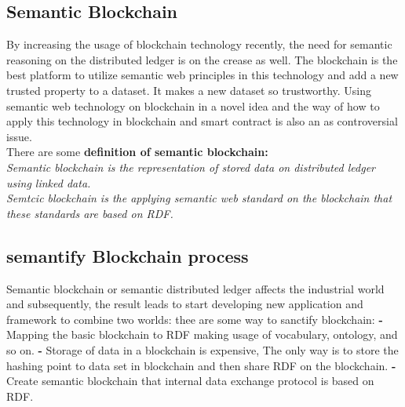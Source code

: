 \subsection{Semantic Blockchain}
By increasing the usage of blockchain technology recently, the need for semantic reasoning on the distributed ledger is on the crease as well. The blockchain is the best platform to utilize semantic web principles in this technology and add a new trusted property to a dataset. It makes a new dataset so trustworthy. 
Using semantic web technology on blockchain in a novel idea and the way of how to apply this technology in blockchain and smart contract is also an as controversial issue.\\
There are some \textbf{definition of semantic blockchain:}\\ 
\textit{Semantic blockchain is the representation of stored data on distributed ledger using linked data. }\\
\textit{Semtcic blockchain is the applying semantic web standard on the blockchain that these standards are based on RDF.}

\subsection{semantify Blockchain process}
Semantic blockchain or semantic distributed ledger affects the industrial world and subsequently, the result leads to start developing new application and framework to combine two worlds:
thee are some way to sanctify blockchain:
\textbf{-}Mapping the basic blockchain to RDF making usage of vocabulary, ontology, and so on.
\textbf{-} Storage of data in a blockchain is expensive, The only way is to store the hashing point to data set in blockchain and then share RDF on the blockchain.
\textbf{-} Create semantic blockchain that internal data exchange protocol is based on RDF\cite{Hector}.

